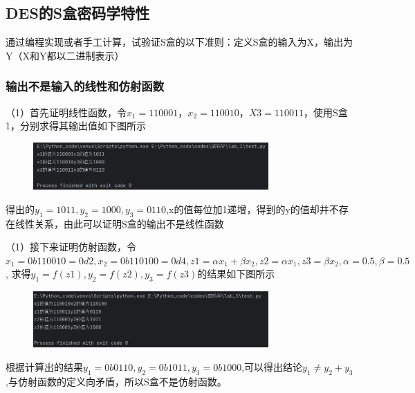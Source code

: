 \documentclass[a4paper,11pt,UTF8]{ctexart}
\newcommand{\bottomcaption}{%
\setlength{\abovecaptionskip}{6pt}%
\setlength{\belowcaptionskip}{6pt}%
\caption}
\newcommand{\xiaowuhao}{\fontsize{9pt}{\baselineskip}\selectfont}   %
\begin{document}
    \subsection{DES的S盒密码学特性}
        通过编程实现或者手工计算，试验证S盒的以下准则：定义S盒的输入为X，输出为Y（X和Y都以二进制表示）
        \subsubsection{输出不是输入的线性和仿射函数}
            （1）首先证明线性函数，令$x_{1}=110001，x_{2}=110010，X3=110011$，使用S盒1，分别求得其输出值如下图所示
            \begin{figure}[H]
                \centering
                \includegraphics[width=9cm]{test_result_1.png}
                \bottomcaption{\xiaowuhao{验证线性函数运行结果}}
            \end{figure}
            得出的$y_{1}=1011,y_{2}=1000,y_{3}=0110$,x的值每位加1递增，得到的y的值却并不存在线性关系，由此可以证明S盒的输出不是线性函数\par

            （1）接下来证明仿射函数，令$x_{1}=0b110010=0d2,x_{2}=0b110100=0d4,z1=\alpha x_{1}+\beta x_{2},z2=\alpha x_{1},z3=\beta x_{2},\alpha =0.5,\beta =0.5$,
            求得$y_{1}=f(z1),y_{2}=f(z2),y_{3}=f(z3)$的结果如下图所示
            \begin{figure}[H]
                \centering
                \includegraphics[width=9cm]{test_result_1_2.png}
                \bottomcaption{\xiaowuhao{验证仿射函数运行结果}}
            \end{figure}
            根据计算出的结果$y_{1}=0b0110,y_{2}=0b1011,y_{3}=0b1000$,可以得出结论$y_{1}\ne y_{2}+y_{3}$,与仿射函数的定义向矛盾，所以S盒不是仿射函数。
\end{document}
